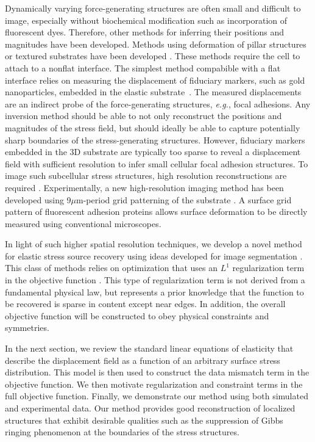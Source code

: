 \documentclass[aps,prl,reprint,twocolumn,groupedaddress,showpacs]{revtex4}
\begin{document}
Dynamically varying force-generating structures are often small and
difficult to image, especially without biochemical modification such
as incorporation of fluorescent dyes. Therefore, other methods for
inferring their positions and magnitudes have been developed. Methods
using deformation of pillar structures \cite{PILLAR} or textured
substrates have been developed \cite{PATTERN}.  These methods require
the cell to attach to a nonflat interface.  The simplest method
compabible with a flat interface relies on measuring the displacement
of fiduciary markers, such as gold nanoparticles, embedded in the
elastic substrate~\cite{WANG2007}. The measured displacements are an
indirect probe of the force-generating structures, \textit{e.g.},
focal adhesions.  Any inversion method should be able to not only
reconstruct the positions and magnitudes of the stress field, but
should ideally be able to capture potentially sharp boundaries of the
stress-generating structures. However, fiduciary markers embedded in
the 3D substrate are typically too sparse to reveal a displacement
field with sufficient resolution to infer small cellular focal
adhesion structures. To image such subcellular stress structures, high
resolution reconstructions are required \cite{USCHWARZ}.
Experimentally, a new high-resolution imaging method has been
developed using 9$\mu$m-period grid patterning of the substrate
\cite{POPESCU}.  A surface grid pattern of fluorescent adhesion
proteins allows surface deformation to be directly measured using
conventional microscopes.

In light of such higher spatial resolution techniques, we develop a
novel method for elastic stress source recovery using ideas developed
for image segmentation \cite{OSHER}.  This class of methods relies on
optimization that uses an $L^{1}$ regularization term in the objective
function \cite{CHAN}.  This type of regularization term is not derived
from a fundamental physical law, but represents a prior knowledge that
the function to be recovered is sparse in content except near
edges. In addition, the overall objective function will be constructed
to obey physical constraints and symmetries.

In the next section, we review the standard linear equations of
elasticity that describe the displacement field as a function of an
arbitrary surface stress distribution. This model is then used to
construct the data mismatch term in the objective function. We then
motivate regularization and constraint terms in the full
objective function. Finally, we demonstrate our method
using both simulated and experimental data. Our method provides
good reconstruction of localized structures that exhibit desirable
qualities such as the suppression of Gibbs ringing phenomenon at the
boundaries of the stress structures.
\end{document}
